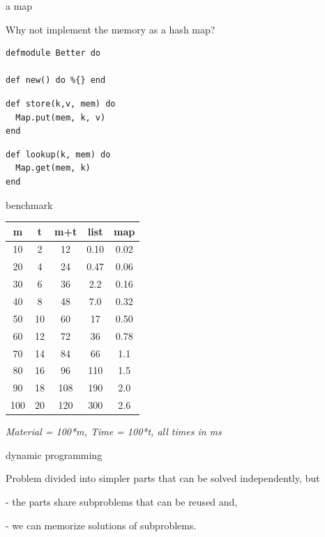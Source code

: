 \begin{frame}[fragile]{a map}

Why not implement the memory as a hash map? 

\vspace{10pt}
\begin{verbatim}
defmodule Better do

def new() do %{} end
\end{verbatim}
\pause
\begin{verbatim}    
def store(k,v, mem) do 
  Map.put(mem, k, v)
end
\end{verbatim}
\pause
\begin{verbatim}        
def lookup(k, mem) do
  Map.get(mem, k)
end
\end{verbatim}

\end{frame}

\begin{frame}{benchmark}


\hspace{100pt}\begin{tabular}{|c|c|c|c|c|}
\hline 
       m & t & m+t & list & map\\
\hline
        10&          2&         12&        0.10&     0.02\\
        20&          4&         24&        0.47&     0.06\\
        30&          6&         36&        2.2&      0.16\\
        40&          8&         48&        7.0&      0.32\\
        50&         10&         60&       17&        0.50\\
        60&         12&         72&       36&        0.78\\
        70&         14&         84&       66&        1.1\\
        80&         16&         96&      110&        1.5\\
        90&         18&        108&      190&        2.0\\
       100&         20&        120&      300&        2.6\\
\hline
\end{tabular}

\vspace{10pt}
{\em Material = 100*m, Time = 100*t, all times in ms}

\end{frame}

\begin{frame}{dynamic programming}

\vspace{40pt}\hspace{80pt}\parbox[l][60pt][l]{240pt}{Problem divided into simpler parts that can be solved independently, but 

\vspace{10pt}\pause
-  the parts share subproblems that can be reused and,

\vspace{10pt}\pause
-  we can memorize solutions of subproblems.
}



\end{frame}


